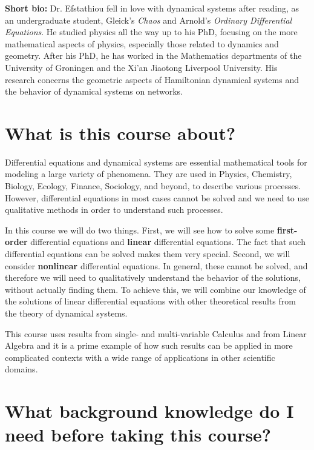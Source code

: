 \documentclass[11pt]{article}
\begin{document}
\textbf{Short bio:} Dr. Efstathiou fell in love with dynamical systems after reading, as an undergraduate student, Gleick's \emph{Chaos} and Arnold's \emph{Ordinary Differential Equations}. He studied physics all the way up to his PhD, focusing on the more mathematical aspects of physics, especially those related to dynamics and geometry. After his PhD, he has worked in the Mathematics departments of the University of Groningen and the Xi'an Jiaotong Liverpool University. His research concerns the geometric aspects of Hamiltonian dynamical systems and the behavior of dynamical systems on networks.


\section{What is this course about?}

Differential equations and dynamical systems are essential mathematical tools for modeling a large variety of phenomena. They are used in Physics, Chemistry, Biology, Ecology, Finance, Sociology, and beyond, to describe various processes. However, differential equations in most cases cannot be solved and we need to use qualitative methods in order to understand such processes. 

In this course we will do two things. First, we will see how to solve some \textbf{first-order} differential equations and \textbf{linear} differential equations. The fact that such differential equations can be solved makes them very special. Second, we will consider \textbf{nonlinear} differential equations. In general, these cannot be solved, and therefore we will need to qualitatively understand the behavior of the solutions, without actually finding them. To achieve this, we will combine our knowledge of the solutions of linear differential equations with other theoretical results from the theory of dynamical systems. 

This course uses results from single- and multi-variable Calculus and from Linear Algebra and it is a prime example of how such results can be applied in more complicated contexts with a wide range of applications in other scientific domains. 


\section{What background knowledge do I need before taking this course?}
\end{document}
